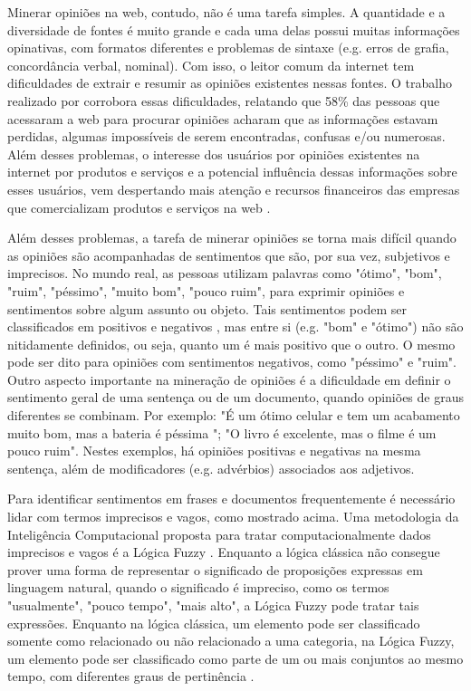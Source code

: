 \documentclass[template.tex]{subfiles}
\begin{document}
Minerar opiniões na web, contudo, não é uma tarefa simples. A quantidade e a diversidade de fontes é muito grande \cite{kim2006forrester} e cada uma delas possui muitas informações opinativas, com formatos diferentes e problemas de sintaxe (e.g. erros de grafia, concordância verbal, nominal). Com isso, o leitor comum da internet tem dificuldades de extrair e resumir as opiniões existentes nessas fontes. O trabalho realizado por  corrobora essas dificuldades, relatando que 58\% das pessoas que acessaram a web para procurar opiniões acharam que as informações estavam perdidas, algumas impossíveis de serem encontradas, confusas e/ou numerosas. Além desses problemas, o interesse dos usuários por opiniões existentes na internet por produtos e serviços e a potencial influência dessas informações sobre esses usuários, vem despertando mais atenção e recursos financeiros das empresas que comercializam produtos e serviços na web \cite{horrigan2008online}. 

Além desses problemas, a tarefa de minerar opiniões se torna mais difícil quando as opiniões são acompanhadas de sentimentos que são, por sua vez, subjetivos e imprecisos. No mundo real, as pessoas utilizam palavras como "ótimo", "bom", "ruim", "péssimo", "muito bom", "pouco ruim", para exprimir opiniões e sentimentos sobre algum assunto ou objeto. Tais sentimentos podem ser classificados em positivos e negativos \cite{bing:2012, pang:2008, pang2002thumbs, turney2002thumbs, Hu:2004}, mas entre si (e.g. "bom" e "ótimo") não são nitidamente definidos, ou seja, quanto um é mais positivo que o outro. O mesmo pode ser dito para opiniões com sentimentos negativos, como "péssimo" e "ruim". Outro aspecto importante na mineração de opiniões é a dificuldade em definir o sentimento geral de uma sentença ou de um documento, quando opiniões de graus diferentes se combinam. Por exemplo: "É um ótimo celular e tem um acabamento muito bom, mas a bateria é péssima "; "O livro é excelente, mas o filme é um pouco ruim". Nestes exemplos, há opiniões positivas e negativas na mesma sentença, além de modificadores (e.g. advérbios) associados aos adjetivos.

Para identificar sentimentos em frases e documentos frequentemente é necessário lidar com termos imprecisos e vagos, como mostrado acima. Uma metodologia da Inteligência Computacional proposta para tratar computacionalmente dados imprecisos e vagos é a Lógica Fuzzy \cite{zadeh:1988}. Enquanto a lógica clássica não consegue prover uma forma de representar o significado de proposições expressas em linguagem natural, quando o significado é impreciso, como os termos "usualmente", "pouco tempo", "mais alto", a Lógica Fuzzy pode tratar tais expressões. Enquanto na lógica clássica, um elemento pode ser classificado somente como relacionado ou não relacionado a uma categoria, na Lógica Fuzzy, um elemento pode ser classificado como parte de um ou mais conjuntos ao mesmo tempo, com diferentes graus de pertinência  \cite{zadeh:1988}.
\end{document}

